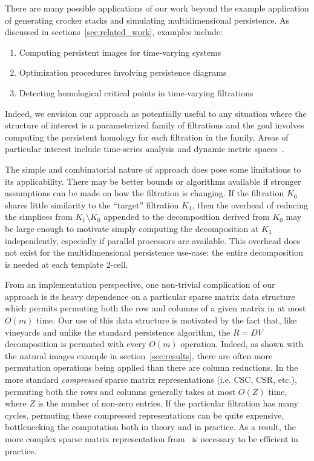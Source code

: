 \documentclass{siamart190516}
\begin{document}
There are many possible applications of our work beyond the example application of generating crocker stacks and simulating multidimensional persistence. As discussed in sections~\ref{sec:related_work}, examples include: 
\begin{enumerate}
	\item Computing persistent images for time-varying systems 
	\item Optimization procedures involving persistence diagrams
	\item Detecting homological critical points in time-varying filtrations
\end{enumerate}
Indeed, we envision our approach as potentially useful to any situation where the structure of interest is a parameterized family of filtrations and the goal involves computing the persistent homology for each filtration in the family. Areas of particular interest include time-series analysis and dynamic metric spaces~\cite{kim2020spatiotemporal}. 

The simple and combinatorial nature of approach does pose some limitations to its applicability. There may be better bounds or algorithms available if stronger assumptions can be made on how the filtration is changing. If the filtration $K_0$ shares little similarity to the ``target'' filtration $K_1$, then the overhead of reducing the simplices from $K_1 \setminus K_0$ appended to the decomposition derived from $K_0$ may be large enough to motivate simply computing the decomposition at $K_1$ independently, especially if parallel processors are available. This overhead does not exist for the multidimensional persistence use-case: the entire decomposition is needed at each template 2-cell. 

From an implementation perspective, one non-trivial complication of our approach is its heavy dependence on a particular sparse matrix data structure which permits permuting both the row and columns of a given matrix in at most $O(m)$ time. Our use of this data structure is motivated by the fact that, like vineyards and unlike the standard persistence algorithm, the $R = DV$ decomposition is permuted with every $O(m)$ operation. Indeed, as shown with the natural images example in section~\ref{sec:results}, there are often more permutation operations being applied than there are column reductions. In the more standard \emph{compressed} sparse matrix representations (i.e. CSC, CSR, etc.), permuting both the rows and columns generally takes at most $O(Z)$ time, where $Z$ is the number of non-zero entries. If the particular filtration has many cycles, permuting these compressed representations can be quite expensive, bottlenecking the computation both in theory and in practice. As a result, the more complex sparse matrix representation from~\cite{cohen2006vines} is necessary to be efficient in practice. 
\end{document}
